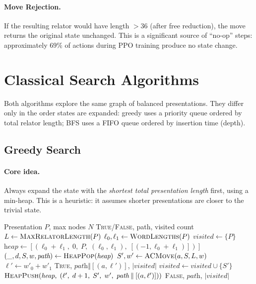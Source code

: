 \documentclass[11pt,a4paper]{article}
\begin{document}
\paragraph{Move Rejection.}
If the resulting relator would have length $> 36$ (after free reduction), the
move returns the original state unchanged.  This is a significant source of
``no-op'' steps: approximately $69\%$ of actions during PPO training produce no
state change.

\section{Classical Search Algorithms}\label{sec:classical}

Both algorithms explore the same graph of balanced presentations.  They differ
only in the order states are expanded: greedy uses a priority queue ordered by
total relator length; BFS uses a FIFO queue ordered by insertion time (depth).

\subsection{Greedy Search}\label{sec:greedy}

\paragraph{Core idea.}
Always expand the state with the \emph{shortest total presentation length}
first, using a min-heap.  This is a heuristic: it assumes shorter presentations
are closer to the trivial state.

\begin{algorithm}[H]
\caption{Greedy Search for AC Trivialisation}
\label{alg:greedy}
\begin{algorithmic}[1]
\Require Presentation $P$, max nodes $N$
\Ensure \textsc{True}/\textsc{False}, path, visited count
\State $L \gets \textsc{MaxRelatorLength}(P)$
\State $\ell_0, \ell_1 \gets \textsc{WordLengths}(P)$
\State $\textit{visited} \gets \{P\}$
\State $\textit{heap} \gets [(\ell_0 + \ell_1,\; 0,\; P,\; (\ell_0, \ell_1),\; [(-1, \ell_0+\ell_1)])]$
  \State $(\_, d, S, w, \textit{path}) \gets \textsc{HeapPop}(\textit{heap})$
    \State $S', w' \gets \textsc{ACMove}(a, S, L, w)$
    \State $\ell' \gets w'_0 + w'_1$
      \State \Return \textsc{True}, $\textit{path} \mathbin\Vert [(a, \ell')]$, $|\textit{visited}|$
    \EndIf
      \State $\textit{visited} \gets \textit{visited} \cup \{S'\}$
      \State $\textsc{HeapPush}(\textit{heap},\; (\ell',\; d+1,\; S',\; w',\; \textit{path} \mathbin\Vert [(a, \ell')]))$
    \EndIf
  \EndFor
\EndWhile
\State \Return \textsc{False}, $\textit{path}$, $|\textit{visited}|$
\end{algorithmic}
\end{algorithm}
\end{document}
